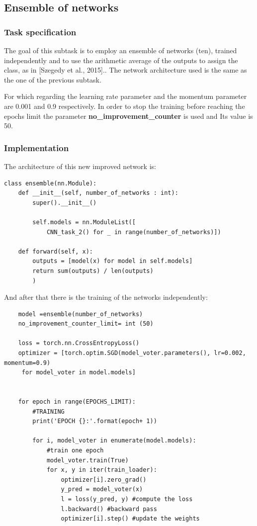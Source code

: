 \documentclass[12pt, a4paper, italian]{scrartcl}
\begin{document}
\newpage

    \subsection{Ensemble of networks}
    \subsubsection{Task specification}
The goal of this subtask is to employ an ensemble of networks (ten), trained independently and to use the arithmetic average of the outputs to assign the class, as in [Szegedy et al., 2015].\cite{Szegedy:Szegedy}. The network architecture used is the same as the one of the previous subtask.

For which regarding the learning rate parameter and the momentum parameter are 0.001 and 0.9 respectively.
In order to stop the training before reaching the epochs limit the parameter \textbf{no\_improvement\_counter} is used and Its value is 50.

\subsubsection{Implementation}
The architecture of this new improved network is:
\begin{verbatim} 
class ensemble(nn.Module):
    def __init__(self, number_of_networks : int):
        super().__init__()

        self.models = nn.ModuleList([
            CNN_task_2() for _ in range(number_of_networks)])

    def forward(self, x):
        outputs = [model(x) for model in self.models]
        return sum(outputs) / len(outputs)
        )
\end{verbatim}

And after that there is the training of the networks independently:
\begin{verbatim} 
    model =ensemble(number_of_networks)
    no_improvement_counter_limit= int (50)

    loss = torch.nn.CrossEntropyLoss()
    optimizer = [torch.optim.SGD(model_voter.parameters(), lr=0.002, momentum=0.9)
     for model_voter in model.models]


    for epoch in range(EPOCHS_LIMIT):
        #TRAINING
        print('EPOCH {}:'.format(epoch+ 1))

        for i, model_voter in enumerate(model.models):
            #train one epoch
            model_voter.train(True)
            for x, y in iter(train_loader):
                optimizer[i].zero_grad()
                y_pred = model_voter(x)
                l = loss(y_pred, y) #compute the loss
                l.backward() #backward pass
                optimizer[i].step() #update the weights

\end{verbatim}
\end{document}
